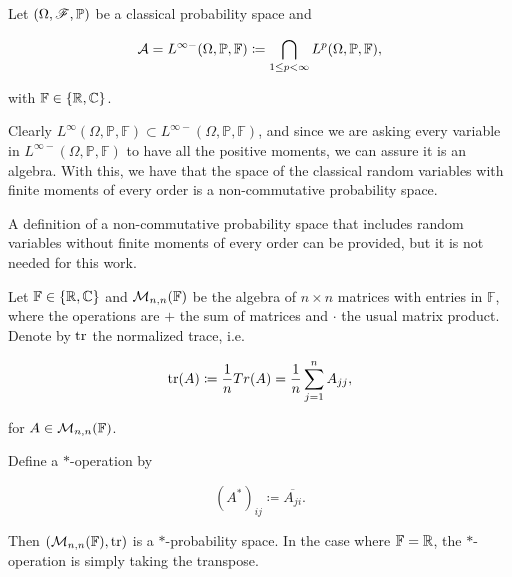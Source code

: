     \begin{example}
        Let $(\Omega, \mathscr F, \mathbb P)$ be a classical probability space and 
        
        \begin{equation*}
            \mathcal A = L^{\infty-}(\Omega, \mathbb P, \mathbb F) \coloneqq \bigcap_{1\le p < \infty} L^p(\Omega, \mathbb P, \mathbb F),
        \end{equation*}
        
        \noindent with $\mathbb F \in \{\mathbb R, \mathbb C\}$. 

        Clearly $ L^{\infty}(\Omega, \mathbb P, \mathbb F) \subset  L^{\infty-}(\Omega, \mathbb P, \mathbb F)$, and since we are asking every variable in $ L^{\infty-}(\Omega, \mathbb P, \mathbb F)$ to have all the positive moments, we can assure it is an algebra. With this, we have that the space of the classical random variables with finite moments of every order is a non-commutative probability space. 
        
      
    \end{example}

    A definition of a non-commutative probability space that includes random variables without finite moments of every order can be provided, but it is not needed for this work.

    \begin{example}
        Let $\mathbb F \in \{\mathbb R,\mathbb C\}$ and $\mathcal M_{n,n}(\mathbb F)$ be the algebra of $n\times n$ matrices with entries in $\mathbb F$, where the operations are $+$ the sum of matrices and $\cdot$ the usual matrix product. Denote by $\mathrm{tr}$ the normalized trace, i.e.

        \begin{equation*}
            \mathrm{tr}(A) \coloneqq \frac1n Tr(A) = \frac1n \sum_{j=1}^n A_{jj},
        \end{equation*}

        \noindent for $A \in \mathcal M_{n,n}(\mathbb F)$.

        Define a $*$-operation by

        \begin{equation*}
            (A^*)_{ij} \coloneqq \overline{A_{ji}}.
        \end{equation*}

        Then $(\mathcal M_{n,n}(\mathbb F),\mathrm{tr})$ is a $*$-probability space. In the case where $\mathbb F = \mathbb R$, the $*$-operation is simply taking the transpose.
    \end{example}

